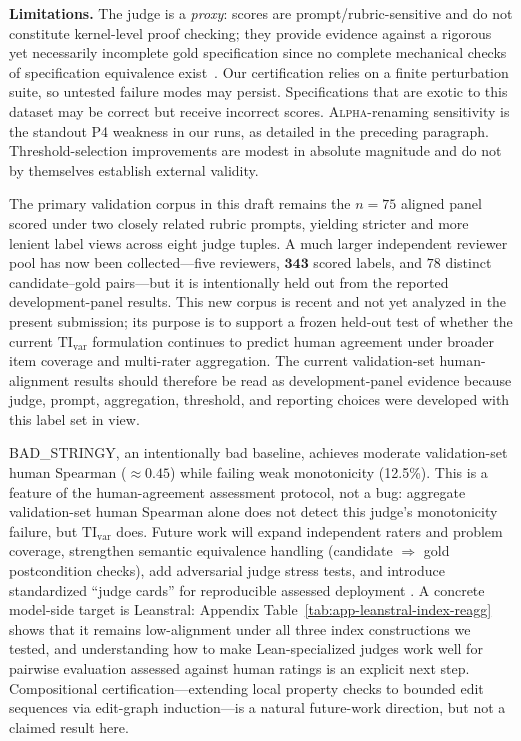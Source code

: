 \documentclass{article}
\begin{document}
\textbf{Limitations.} The judge is a \emph{proxy}: scores are prompt/rubric-sensitive and do not constitute kernel-level proof checking; they provide evidence against a rigorous yet necessarily incomplete gold specification since no complete mechanical checks of specification equivalence exist~\citep{rice1953}.
Our certification relies on a finite perturbation suite, so untested failure modes may persist. Specifications that are exotic to this dataset may be correct but receive incorrect scores.
\textsc{Alpha}-renaming sensitivity is the standout P4 weakness in our runs, as detailed in the preceding paragraph.
Threshold-selection improvements are modest in absolute magnitude and do not by themselves establish external validity.

The primary validation corpus in this draft remains the \(n=75\) aligned panel scored under two closely related rubric prompts, yielding stricter and more lenient label views across eight judge tuples. A much larger independent reviewer pool has now been collected---five reviewers, \(\mathbf{343}\) scored labels, and \(78\) distinct candidate--gold pairs---but it is intentionally held out from the reported development-panel results. This new corpus is recent and not yet analyzed in the present submission; its purpose is to support a frozen held-out test of whether the current \(\mathrm{TI}_{\mathrm{var}}\) formulation continues to predict human agreement under broader item coverage and multi-rater aggregation.
The current validation-set human-alignment results should therefore be read as development-panel evidence because judge, prompt, aggregation, threshold, and reporting choices were developed with this label set in view.

BAD\_STRINGY, an intentionally bad baseline, achieves moderate validation-set human Spearman (\(\approx0.45\)) while failing weak monotonicity (12.5\%).
This is a feature of the human-agreement assessment protocol, not a bug: aggregate validation-set human Spearman alone does not detect this judge's monotonicity failure, but \(\mathrm{TI}_{\mathrm{var}}\) does.
Future work will expand independent raters and problem coverage, strengthen semantic equivalence handling (candidate $\Rightarrow$ gold postcondition checks), add adversarial judge stress tests, and introduce standardized ``judge cards'' for reproducible assessed deployment \citep{zhou2025graders}. A concrete model-side target is Leanstral: Appendix Table~\ref{tab:app-leanstral-index-reagg} shows that it remains low-alignment under all three index constructions we tested, and understanding how to make Lean-specialized judges work well for pairwise evaluation assessed against human ratings is an explicit next step.
Compositional certification---extending local property checks to bounded edit sequences via edit-graph induction---is a natural future-work direction, but not a claimed result here.
\end{document}
